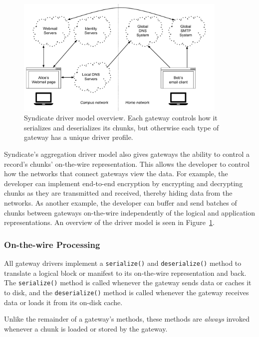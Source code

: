 \begin{figure}[h]
   \centering
   \includegraphics[width=0.9\textwidth,page=22]{figures/dissertation-figures}
   \caption{Syndicate driver model overview.  Each gateway controls how it
   serializes and deserializes its chunks, but otherwise each type of gateway has a
   unique driver profile.}
   \label{fig:chap3-syndicate-driver-model}
\end{figure}

Syndicate's aggregation driver model also gives gateways the ability to
control a record's chunks' on-the-wire representation.  This allows the
developer to control how the networks that connect gateways view the data.  For
example, the developer can implement end-to-end encryption by encrypting and
decrypting chunks as they are transmitted and received, thereby hiding
data from the networks.  As another example, the developer can buffer and send
batches of chunks between gateways on-the-wire independently of the logical and
application representations.  An overview of the driver model is seen in
Figure~\ref{fig:chap3-syndicate-driver-model}.

\subsubsection{On-the-wire Processing}

All gateway drivers implement a \texttt{serialize()} and \texttt{deserialize()}
method to translate a logical block or manifest to its on-the-wire
representation and back.  The \texttt{serialize()} method is called whenever the gateway sends
data or caches it to disk, and the \texttt{deserialize()} method is called
whenever the gateway receives data or loads it from its on-disk cache.

Unlike the remainder of a gateway's methods, these methods are \emph{always}
invoked whenever a chunk is loaded or stored by the gateway.

